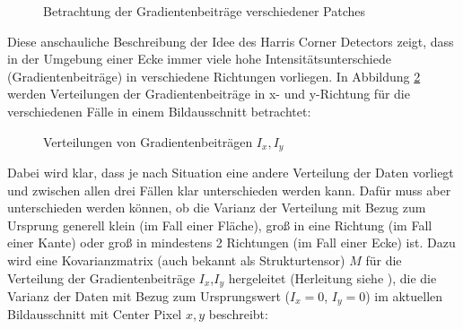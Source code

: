 \begin{figure}[H]
\begin{minipage}{0.3\textwidth}
    \label{c)}
  \end{minipage}
\caption{Betrachtung der Gradientenbeiträge verschiedener Patches}
\label{gradient}
\end{figure}

Diese anschauliche Beschreibung der Idee des Harris Corner Detectors zeigt, dass in der Umgebung einer Ecke immer viele hohe Intensitätsunterschiede (Gradientenbeiträge) in verschiedene Richtungen vorliegen. In Abbildung \ref{harris} werden Verteilungen der Gradientenbeiträge in x- und y-Richtung für die verschiedenen Fälle in einem Bildausschnitt betrachtet:
\bigskip
\bigskip
\begin{figure}
  \centering
  \caption{Verteilungen von Gradientenbeiträgen $I_x,I_y$ \cite{collinscourse}}
  \label{harris}
\end{figure}
\newpage
Dabei wird klar, dass je nach Situation eine andere Verteilung der Daten vorliegt und zwischen allen drei Fällen klar unterschieden werden kann. Dafür muss aber unterschieden werden können, ob die Varianz der Verteilung mit Bezug zum Ursprung generell klein (im Fall einer Fläche), groß in eine Richtung (im Fall einer Kante) oder groß in mindestens 2 Richtungen (im Fall einer Ecke) ist. Dazu wird eine Kovarianzmatrix (auch bekannt als Strukturtensor) $M$ für die Verteilung der Gradientenbeiträge $I_x$,$I_y$ hergeleitet (Herleitung siehe \cite{cscourse}), die die Varianz der Daten mit Bezug zum Ursprungswert ($I_x=0$, $I_y=0$) im aktuellen Bildausschnitt mit Center Pixel $x,y$ beschreibt:

